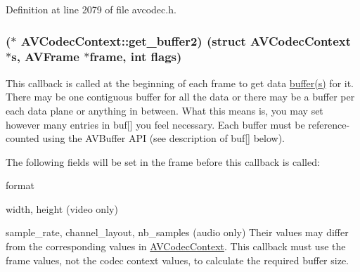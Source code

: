 Definition at line 2079 of file avcodec.\+h.

\subsubsection[{\texorpdfstring{get\+\_\+buffer2}{get_buffer2}}]{($\ast$ A\+V\+Codec\+Context\+::get\+\_\+buffer2) (struct {\bf A\+V\+Codec\+Context} $\ast${\bf s}, {\bf A\+V\+Frame} $\ast$frame, {\bf int} {\bf flags})}\hypertarget{struct_a_v_codec_context_aef79333a4c6abf1628c55d75ec82bede}{}\label{struct_a_v_codec_context_aef79333a4c6abf1628c55d75ec82bede}
This callback is called at the beginning of each frame to get data \hyperlink{xmlparse_8c_aaadc06b5dac8070de2c8677210967bdb}{buffer(s)} for it. There may be one contiguous buffer for all the data or there may be a buffer per each data plane or anything in between. What this means is, you may set however many entries in buf\mbox{[}\mbox{]} you feel necessary. Each buffer must be reference-\/counted using the A\+V\+Buffer A\+PI (see description of buf\mbox{[}\mbox{]} below).

The following fields will be set in the frame before this callback is called\+:
\begin{DoxyItemize}
\item format
\item width, height (video only)
\item sample\+\_\+rate, channel\+\_\+layout, nb\+\_\+samples (audio only) Their values may differ from the corresponding values in \hyperlink{struct_a_v_codec_context}{A\+V\+Codec\+Context}. This callback must use the frame values, not the codec context values, to calculate the required buffer size.
\end{DoxyItemize}

